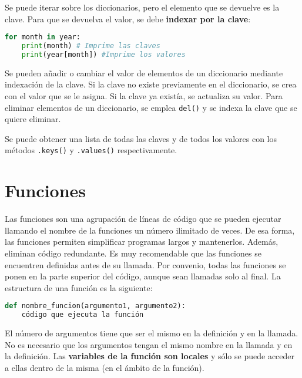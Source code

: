 Se puede iterar sobre los diccionarios, pero el  elemento que se devuelve es la clave. Para que se devuelva el valor, se debe \textbf{indexar por la clave}:
\begin{lstlisting}[language=Python]
for month in year:
	print(month) # Imprime las claves
	print(year[month]) #Imprime los valores
\end{lstlisting}

Se pueden añadir o cambiar el valor de elementos de un diccionario mediante indexación de la clave. Si la clave no existe previamente en el diccionario, se crea con el valor que se le asigna. Si la clave ya existía, se actualiza su valor. Para eliminar elementos de un diccionario, se emplea \texttt{del()} y se indexa la clave que se quiere eliminar.

Se puede obtener una lista de todas las claves y de todos los valores con los métodos \texttt{.keys()} y \texttt{.values()} respectivamente. 

\section{Funciones}
Las funciones son una agrupación de líneas de código que se pueden ejecutar llamando el nombre de la funciones un número ilimitado de veces. De esa forma, las funciones permiten simplificar programas largos y mantenerlos. Además, eliminan código redundante. Es muy recomendable que las funciones se encuentren definidas antes de su llamada. Por convenio, todas las funciones se ponen en la parte superior del código, aunque sean llamadas solo al final. La estructura de una función es la siguiente:
\begin{lstlisting}[language=Python]
def nombre_funcion(argumento1, argumento2):
	código que ejecuta la función
\end{lstlisting}
El número de argumentos tiene que ser el mismo en la definición y en la llamada. No es necesario que los argumentos tengan el mismo nombre en la llamada y en la definición. Las \textbf{variables de la función son locales} y sólo se puede acceder a ellas dentro de la misma (en el ámbito de la función). 

